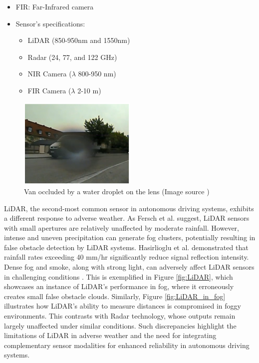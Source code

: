 \documentclass[report.tex]{subfiles}
\begin{document}
\begin{table}
\begin{tablenotes}
\begin{itemize}
                \item FIR: Far-Infrared camera
                \item Sensor's specifications:
                \begin{itemize}
                    \item LiDAR (850-950nm and 1550nm)
                    \item Radar (24, 77, and 122 GHz)
                    \item NIR Camera ($\lambda$ 800-950 nm)
                    \item FIR Camera ($\lambda$ 2-10 \textmu m)
                \end{itemize}
            \end{itemize}
        \end{tablenotes}
    \end{table}

    
    \begin{figure}[h]
        \centering
        \includegraphics[width=0.5\textwidth]{images/rain_droplet.png}
        \caption{Van occluded by a water droplet on the lens (Image source \cite{Nobis2020May})}
        \label{fig:camera_in_rain}
    \end{figure}
    
    LiDAR, the second-most common sensor in autonomous driving systems, exhibits a different response to adverse weather. As Fersch et al. \cite{fersch2016influence} suggest, LiDAR sensors with small apertures are relatively unaffected by moderate rainfall. However, intense and uneven precipitation can generate fog clusters, potentially resulting in false obstacle detection by LiDAR systems. Hasirlioglu et al. \cite{hasirlioglu2016modeling} demonstrated that rainfall rates exceeding 40 mm/hr significantly reduce signal reflection intensity. Dense fog and smoke, along with strong light, can adversely affect LiDAR sensors in challenging conditions \cite{zhang2023perception, acarballo2020libre}. This is exemplified in Figure \ref{fig:LiDAR}, which showcases an instance of LiDAR's performance in fog, where it erroneously creates small false obstacle clouds. Similarly, Figure \ref{fig:LiDAR_in_fog} illustrates how LiDAR's ability to measure distances is compromised in foggy environments. This contrasts with Radar technology, whose outputs remain largely unaffected under similar conditions. Such discrepancies highlight the limitations of LiDAR in adverse weather and the need for integrating complementary sensor modalities for enhanced reliability in autonomous driving systems.
\end{document}
